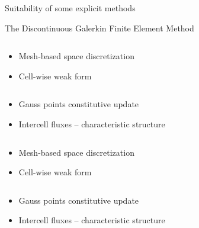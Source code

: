 \begin{frame}{Suitability of some explicit methods}
  \begin{block}{The Discontinuous Galerkin Finite Element Method \cite{Cockburn}}
    \vskip 4pt
    \begin{overprint}
      \begin{columns}
        \begin{footnotesize}
          \begin{column}{0.4\textwidth}
            \begin{itemize}
            \item[] Mesh-based space discretization
            \item[] Cell-wise weak form \cite{NeutronDG}
            \end{itemize}
          \end{column}
          \begin{column}{0.6\textwidth}
            \begin{itemize}
            \item[] Gauss points constitutive update
            \item[] Intercell fluxes -- characteristic structure
            \end{itemize}
          \end{column}
        \end{footnotesize}
      \end{columns}
      \begin{columns}
        \begin{footnotesize}
          \begin{column}{0.4\textwidth}
            \begin{itemize}
            \item[] Mesh-based space discretization
            \item[] Cell-wise weak form \cite{NeutronDG}
            \end{itemize}
          \end{column}
          \begin{column}{0.6\textwidth}
            \begin{itemize}
            \item[] Gauss points constitutive update
            \item[] Intercell fluxes -- characteristic structure
            \end{itemize}
          \end{column}
        \end{footnotesize}

\end{columns}
\end{overprint}
\end{block}
\end{frame}
